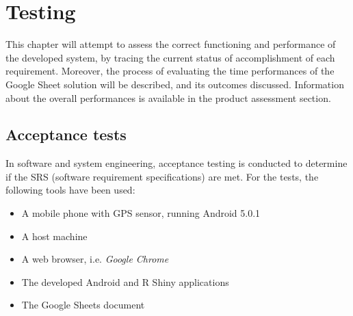 \chapter{Testing}
This chapter will attempt to assess the correct functioning and performance of the developed system, by tracing the current status of accomplishment of each requirement.
Moreover, the process of evaluating the time performances of the Google Sheet solution will be described, and its outcomes discussed.
Information about the overall performances is available in the product assessment section.

\section{Acceptance tests}
In software and system engineering, acceptance testing is conducted to determine if the SRS (software requirement specifications) are met.
For the tests, the following tools have been used:
\begin{itemize}
	\item A mobile phone with GPS sensor, running Android 5.0.1
	\item A host machine
	\item A web browser, i.e. \emph{Google Chrome}
	\item The developed Android and R Shiny applications
	\item The Google Sheets document
\end{itemize}



